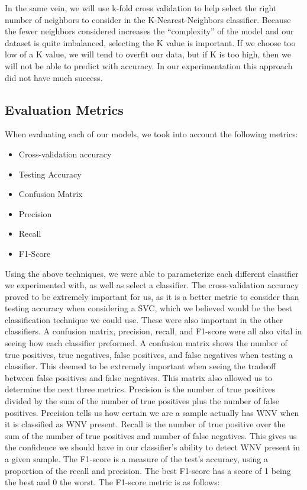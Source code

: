 \documentclass{article} %
\begin{document}
In the same vein, we will use k-fold cross validation to help select the right number of neighbors to consider in the K-Nearest-Neighbors classifier. Because the fewer neighbors considered increases the “complexity” of the model and our dataset is quite imbalanced, selecting the K value is important. If we choose too low of a K value, we will tend to overfit our data, but if K is too high, then we will not be able to predict with accuracy. In our experimentation this approach did not have much success. 

\subsection{Evaluation Metrics}
When evaluating each of our models, we took into account the following metrics:
\begin{itemize}
\item Cross-validation accuracy

\item Testing Accuracy

\item  Confusion Matrix

\item  Precision

\item  Recall

\item  F1-Score
\end{itemize}

Using the above techniques, we were able to parameterize each different classifier we experimented with, as well as select a classifier. The cross-validation accuracy proved to be extremely important for us, as it is a better metric to consider than testing accuracy when considering a SVC, which we believed would be the best classification technique we could use.  These were also important in the other classifiers.  A confusion matrix, precision, recall, and F1-score were all also vital in seeing how each classifier preformed.  A confusion matrix shows the number of true positives, true negatives, false positives, and false negatives when testing a classifier.  This deemed to be extremely important when seeing the tradeoff between false positives and false negatives.  This matrix also allowed us to determine the next three metrics.  Precision is the number of true positives divided by the sum of the number of true positives plus the number of false positives.  Precision tells us how certain we are a sample actually has WNV when it is classified as WNV present.  Recall is the number of true positive over the sum of the number of true positives and number of false negatives. This gives us the confidence we should have in our classifier’s ability to detect WNV present in a given sample.  The F1-score is a measure of the test’s accuracy, using a proportion of the recall and precision.  The best F1-score has a score of 1 being the best and 0 the worst.  The F1-score metric is as follows: 
\end{document}
